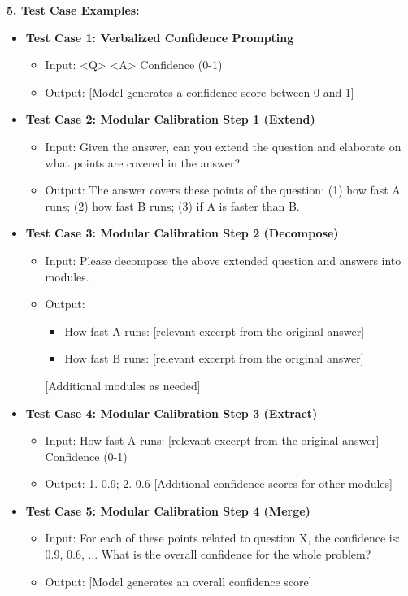 \begin{tcolorbox}[colback=blue!5!white,colframe=blue!75!black,title=\textbf{Modular Calibration for Long-form Answers (Part 2)}]
    \small 

    \textbf{5. Test Case Examples:}
    \begin{itemize}
        \item \textbf{Test Case 1: Verbalized Confidence Prompting}
        \begin{itemize}
            \item Input: <Q> <A> Confidence (0-1)
            \item Output: [Model generates a confidence score between 0 and 1]
        \end{itemize}
        \item \textbf{Test Case 2: Modular Calibration Step 1 (Extend)}
        \begin{itemize}
            \item Input: Given the answer, can you extend the question and elaborate on what points are covered in the answer?
            \item Output: The answer covers these points of the question: (1) how fast A runs; (2) how fast B runs; (3) if A is faster than B.
        \end{itemize}
        \item \textbf{Test Case 3: Modular Calibration Step 2 (Decompose)}
        \begin{itemize}
            \item Input: Please decompose the above extended question and answers into modules.
            \item Output:
            \begin{itemize}
                \item How fast A runs: [relevant excerpt from the original answer]
                \item How fast B runs: [relevant excerpt from the original answer]
            \end{itemize}
            [Additional modules as needed]
        \end{itemize}
        \item \textbf{Test Case 4: Modular Calibration Step 3 (Extract)}
        \begin{itemize}
            \item Input: How fast A runs: [relevant excerpt from the original answer] Confidence (0-1)
            \item Output: 1. 0.9; 2. 0.6 [Additional confidence scores for other modules]
        \end{itemize}
        \item \textbf{Test Case 5: Modular Calibration Step 4 (Merge)}
        \begin{itemize}
            \item Input: For each of these points related to question X, the confidence is: 0.9, 0.6, ... What is the overall confidence for the whole problem?
            \item Output: [Model generates an overall confidence score]
        \end{itemize}
    \end{itemize}


\end{tcolorbox}
